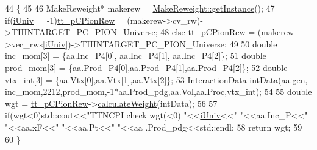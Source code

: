 \begin{DoxyCode}
44                                                                              \{
45     
46     MakeReweight*  makerew =  \hyperlink{class_neutrino_flux_reweight_1_1_make_reweight_a42d1fa92a1e30bd80538188e0c9d8b4a}{MakeReweight::getInstance}();
47     \textcolor{keywordflow}{if}(\hyperlink{class_neutrino_flux_reweight_1_1_thin_targetn_c_pion_reweighter_a4739c4b376e4e9d4a1b6968efddf41d8}{iUniv}==-1)\hyperlink{class_neutrino_flux_reweight_1_1_thin_targetn_c_pion_reweighter_a3cd598e2a95c1cf40db298236f3551c9}{tt\_pCPionRew} = (makerew->cv\_rw)->THINTARGET\_PC\_PION\_Universe;
48     \textcolor{keywordflow}{else} \hyperlink{class_neutrino_flux_reweight_1_1_thin_targetn_c_pion_reweighter_a3cd598e2a95c1cf40db298236f3551c9}{tt\_pCPionRew} = (makerew->vec\_rws[\hyperlink{class_neutrino_flux_reweight_1_1_thin_targetn_c_pion_reweighter_a4739c4b376e4e9d4a1b6968efddf41d8}{iUniv}])->THINTARGET\_PC\_PION\_Universe;
49 
50     \textcolor{keywordtype}{double} inc\_mom[3]  = \{aa.Inc\_P4[0], aa.Inc\_P4[1], aa.Inc\_P4[2]\};
51     \textcolor{keywordtype}{double} prod\_mom[3] = \{aa.Prod\_P4[0],aa.Prod\_P4[1],aa.Prod\_P4[2]\};
52     \textcolor{keywordtype}{double} vtx\_int[3]  = \{aa.Vtx[0],aa.Vtx[1],aa.Vtx[2]\};
53     InteractionData intData(aa.gen, inc\_mom,2212,prod\_mom,-1*aa.Prod\_pdg,aa.Vol,aa.Proc,vtx\_int);
54 
55     \textcolor{keywordtype}{double} wgt = \hyperlink{class_neutrino_flux_reweight_1_1_thin_targetn_c_pion_reweighter_a3cd598e2a95c1cf40db298236f3551c9}{tt\_pCPionRew}->\hyperlink{class_neutrino_flux_reweight_1_1_thin_targetp_c_pion_reweighter_ab797bbeeedb04cda73feef891434cd5f}{calculateWeight}(intData);
56 
57     \textcolor{keywordflow}{if}(wgt<0)std::cout<<\textcolor{stringliteral}{"TTNCPI check wgt(<0) "}<<\hyperlink{class_neutrino_flux_reweight_1_1_thin_targetn_c_pion_reweighter_a4739c4b376e4e9d4a1b6968efddf41d8}{iUniv}<<\textcolor{stringliteral}{" "}<<aa.Inc\_P<<\textcolor{stringliteral}{" "}<<aa.xF<<\textcolor{stringliteral}{" "}<<aa.Pt<<\textcolor{stringliteral}{" "}<<aa
      .Prod\_pdg<<std::endl;
58     \textcolor{keywordflow}{return} wgt;
59       
60   \}
\end{DoxyCode}
